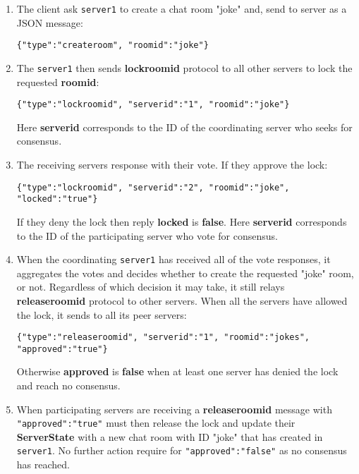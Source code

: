 \documentclass[dareport.tex]{subfiles}
\begin{document}
\begin{enumerate}[leftmargin=*]

\item The client ask \verb|server1| to create a chat room "joke" and, send to server as a JSON message:
\begin{small}
\begin{verbatim}
{"type":"createroom", "roomid":"joke"}
\end{verbatim}
\end{small}

\item The \verb|server1| then sends \textbf{lockroomid} protocol to all other servers to lock the requested \textbf{roomid}:
\begin{small}
\begin{verbatim}
{"type":"lockroomid", "serverid":"1", "roomid":"joke"}
\end{verbatim}
\end{small}
Here \textbf{serverid} corresponds to the ID of the coordinating server who seeks for consensus.

\item The receiving servers response with their vote. If they approve the lock:
\begin{small}
\begin{verbatim}
{"type":"lockroomid", "serverid":"2", "roomid":"joke", "locked":"true"}
\end{verbatim}
\end{small}
If they deny the lock then reply \textbf{locked} is \textbf{false}. Here \textbf{serverid} corresponds to the ID of the participating server who vote for consensus.

\item When the coordinating \verb|server1| has received all of the vote responses, it aggregates the votes and decides whether to create the requested "joke" room, or not. Regardless of which decision it may take, it still relays \textbf{releaseroomid} protocol to other servers. When all the servers have allowed the lock, it sends to all its peer servers:
\begin{small}
\begin{verbatim}
{"type":"releaseroomid", "serverid":"1", "roomid":"jokes", "approved":"true"}
\end{verbatim}
\end{small}
Otherwise \textbf{approved} is \textbf{false} when at least one server has denied the lock and reach no consensus.

\item When participating servers are receiving a \textbf{releaseroomid} message with \verb|"approved":"true"| must then release the lock and update their \textbf{ServerState} with a new chat room with ID "joke" that has created in \verb|server1|. No further action require for \verb|"approved":"false"| as no consensus has reached.


\end{enumerate}
\end{document}
